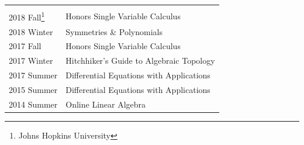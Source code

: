 \documentclass[
]{report}
\begin{document}
\begin{longtable}[]{@{}ll@{}}
\begin{minipage}[t]{0.57\columnwidth}
\strut
\end{minipage}\tabularnewline
\begin{minipage}[t]{0.37\columnwidth}\raggedright
2018 Fall\footnote{Johns Hopkins University}\strut
\end{minipage} & \begin{minipage}[t]{0.57\columnwidth}\raggedright
Honors Single Variable Calculus\strut
\end{minipage}\tabularnewline
\begin{minipage}[t]{0.37\columnwidth}\raggedright
2018 Winter\strut
\end{minipage} & \begin{minipage}[t]{0.57\columnwidth}\raggedright
Symmetries \& Polynomials\strut
\end{minipage}\tabularnewline
\begin{minipage}[t]{0.37\columnwidth}\raggedright
2017 Fall\strut
\end{minipage} & \begin{minipage}[t]{0.57\columnwidth}\raggedright
Honors Single Variable Calculus\strut
\end{minipage}\tabularnewline
\begin{minipage}[t]{0.37\columnwidth}\raggedright
2017 Winter\strut
\end{minipage} & \begin{minipage}[t]{0.57\columnwidth}\raggedright
Hitchhiker's Guide to Algebraic Topology\strut
\end{minipage}\tabularnewline
\begin{minipage}[t]{0.37\columnwidth}\raggedright
2017 Summer\strut
\end{minipage} & \begin{minipage}[t]{0.57\columnwidth}\raggedright
Differential Equations with Applications\strut
\end{minipage}\tabularnewline
\begin{minipage}[t]{0.37\columnwidth}\raggedright
2015 Summer\strut
\end{minipage} & \begin{minipage}[t]{0.57\columnwidth}\raggedright
Differential Equations with Applications\strut
\end{minipage}\tabularnewline
\begin{minipage}[t]{0.37\columnwidth}\raggedright
2014 Summer\strut
\end{minipage} & \begin{minipage}[t]{0.57\columnwidth}\raggedright
Online Linear Algebra\strut
\end{minipage}\tabularnewline

\end{longtable}
\end{document}
